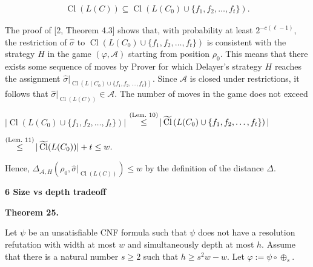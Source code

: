 \documentclass[10pt,a4paper]{article}
\begin{document}
 
\[\begin{gathered}\operatorname{Cl}(L(C))\subseteq\operatorname{Cl}\left(L(C_{0})\cup\{f_{1},f_{2},\dots,f_{t}\}\right).\end{gathered}\] 
 




The proof of [2, Theorem 4.3] shows that, with probability at least $2^{-c(\ell-1)}$, the restriction of
$\hat{\sigma}$ to $\operatorname{Cl}(L(C_{0})\cup\{f_{1},f_{2},\dots,f_{t}\})$ is consistent with the strategy $H$ in the game
$(\varphi,\mathcal{A})$ starting from position $\rho_{0}$.
This means that there exists some sequence of moves by Prover for which Delayer’s strategy $H$ reaches the assignment
$\hat{\sigma}|_{\operatorname{Cl}(L(C_{0})\cup\{f_{1},f_{2},\dots,f_{t}\})}$.
Since $\mathcal{A}$ is closed under restrictions, it follows that $\hat{\sigma}|_{\operatorname{Cl}(L(C))}\in\mathcal{A}$.
The number of moves in the game does not exceed\par





 
$\displaystyle|\operatorname{Cl}\left(L(C_{0})\cup\{f_{1},f_{2},\dots,f_{t}\}\right)|$ 
$\displaystyle\mathop{\leq}^{\mbox{\scriptsize(Lem.\nobreak\ 10)}}|\operatorname{\widetilde{Cl}}\left(L(C_{0})\cup\{f_{1},f_{2},\dots,f_{t}\}\right)|$ 
 




 
 
$\displaystyle\mathop{\leq}^{\mbox{\scriptsize(Lem.\nobreak\ 11)}}|\operatorname{\widetilde{Cl}}(L(C_{0}))|+t\leq w.$ 
 




Hence, $\Delta_{\mathcal{A},H}(\rho_{0},\hat{\sigma}|_{\operatorname{Cl}(L(C))})\leq w$ by the definition of the distance $\Delta$.\par


\par\medskip\noindent\textbf{
6 Size vs depth tradeoff}\par


\par\medskip\noindent\textbf{
Theorem 25.
}\par



Let $\psi$ be an unsatisfiable CNF formula such that $\psi$ does not have a resolution
refutation with width at most $w$ and simultaneously depth at most $h$. Assume that there is a natural number $s\geq 2$ such that $h\geq s^{2}w-w$.
Let $\varphi:=\psi\circ\oplus_{s}$.\par
\end{document}
